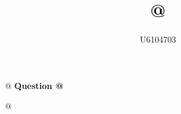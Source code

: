 \documentclass{article}
\title{@}
\author{U6104703}
\date{}
\begin{document}
\maketitle
@
\vspace{.3cm}
\textbf{Question @} \\
\vspace{.3cm}

@
\end{document}
